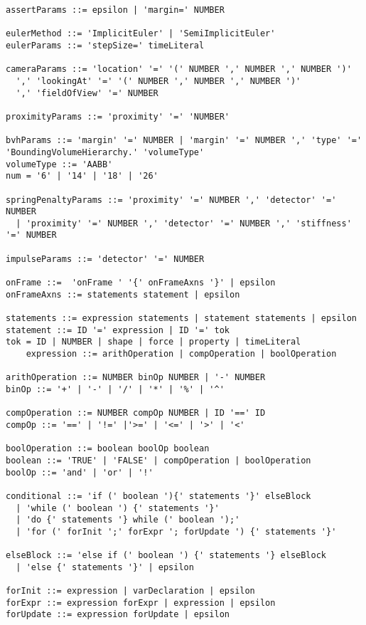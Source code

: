 \documentclass[letterpaper]{article}
\begin{document}
\begin{verbatim}
assertParams ::= epsilon | 'margin=' NUMBER 

eulerMethod ::= 'ImplicitEuler' | 'SemiImplicitEuler'
eulerParams ::= 'stepSize=' timeLiteral

cameraParams ::= 'location' '=' '(' NUMBER ',' NUMBER ',' NUMBER ')'
  ',' 'lookingAt' '=' '(' NUMBER ',' NUMBER ',' NUMBER ')' 
  ',' 'fieldOfView' '=' NUMBER

proximityParams ::= 'proximity' '=' 'NUMBER'

bvhParams ::= 'margin' '=' NUMBER | 'margin' '=' NUMBER ',' 'type' '=' 'BoundingVolumeHierarchy.' 'volumeType'
volumeType ::= 'AABB'
num = '6' | '14' | '18' | '26'

springPenaltyParams ::= 'proximity' '=' NUMBER ',' 'detector' '=' NUMBER
  | 'proximity' '=' NUMBER ',' 'detector' '=' NUMBER ',' 'stiffness' '=' NUMBER 

impulseParams ::= 'detector' '=' NUMBER

onFrame ::=  'onFrame ' '{' onFrameAxns '}' | epsilon
onFrameAxns ::= statements statement | epsilon

statements ::= expression statements | statement statements | epsilon
statement ::= ID '=' expression | ID '=' tok
tok = ID | NUMBER | shape | force | property | timeLiteral
	expression ::= arithOperation | compOperation | boolOperation

arithOperation ::= NUMBER binOp NUMBER | '-' NUMBER
binOp ::= '+' | '-' | '/' | '*' | '%' | '^'

compOperation ::= NUMBER compOp NUMBER | ID '==' ID
compOp ::= '==' | '!=' |'>=' | '<=' | '>' | '<'

boolOperation ::= boolean boolOp boolean
boolean ::= 'TRUE' | 'FALSE' | compOperation | boolOperation
boolOp ::= 'and' | 'or' | '!'

conditional ::= 'if (' boolean '){' statements '}' elseBlock 
  | 'while (' boolean ') {' statements '}' 
  | 'do {' statements '} while (' boolean ');' 
  | 'for (' forInit ';' forExpr '; forUpdate ') {' statements '}'

elseBlock ::= 'else if (' boolean ') {' statements '} elseBlock 
  | 'else {' statements '}' | epsilon

forInit ::= expression | varDeclaration | epsilon
forExpr ::= expression forExpr | expression | epsilon
forUpdate ::= expression forUpdate | epsilon

\end{verbatim}
\end{document}
